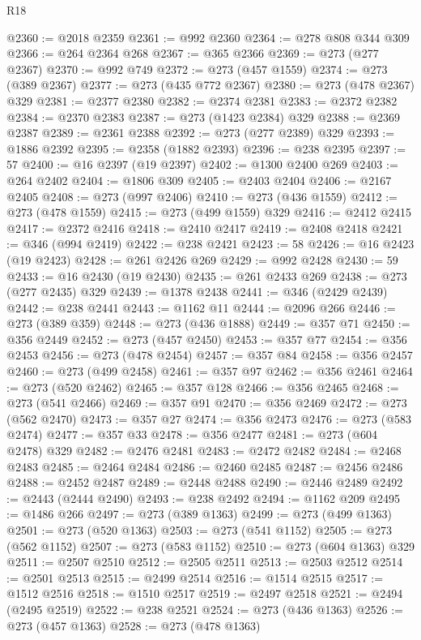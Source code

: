 \begin{lexlean}{R18}
\begin{coremodule}
{{{{{{{{{{{{{{{{{{{@2360 := @2018 @2359
@2361 := @992 @2360
@2364 := @278 @808 @344 @309
@2366 := @264 @2364 @268
@2367 := @365 @2366
@2369 := @273 (@277 @2367)
@2370 := @992 @749
@2372 := @273 (@457 @1559)
@2374 := @273 (@389 @2367)
@2377 := @273 (@435 @772 @2367)
@2380 := @273 (@478 @2367) @329
@2381 := @2377 @2380
@2382 := @2374 @2381
@2383 := @2372 @2382
@2384 := @2370 @2383
@2387 := @273 (@1423 @2384) @329
@2388 := @2369 @2387
@2389 := @2361 @2388
@2392 := @273 (@277 @2389) @329
@2393 := @1886 @2392
@2395 := @2358 (@1882 @2393)
@2396 := @238 @2395
@2397 := 57
@2400 := @16 @2397 (@19 @2397)
@2402 := @1300 @2400 @269
@2403 := @264 @2402
@2404 := @1806 @309
@2405 := @2403 @2404
@2406 := @2167 @2405
@2408 := @273 (@997 @2406)
@2410 := @273 (@436 @1559)
@2412 := @273 (@478 @1559)
@2415 := @273 (@499 @1559) @329
@2416 := @2412 @2415
@2417 := @2372 @2416
@2418 := @2410 @2417
@2419 := @2408 @2418
@2421 := @346 (@994 @2419)
@2422 := @238 @2421
@2423 := 58
@2426 := @16 @2423 (@19 @2423)
@2428 := @261 @2426 @269
@2429 := @992 @2428
@2430 := 59
@2433 := @16 @2430 (@19 @2430)
@2435 := @261 @2433 @269
@2438 := @273 (@277 @2435) @329
@2439 := @1378 @2438
@2441 := @346 (@2429 @2439)
@2442 := @238 @2441
@2443 := @1162 @11
@2444 := @2096 @266
@2446 := @273 (@389 @359)
@2448 := @273 (@436 @1888)
@2449 := @357 @71
@2450 := @356 @2449
@2452 := @273 (@457 @2450)
@2453 := @357 @77
@2454 := @356 @2453
@2456 := @273 (@478 @2454)
@2457 := @357 @84
@2458 := @356 @2457
@2460 := @273 (@499 @2458)
@2461 := @357 @97
@2462 := @356 @2461
@2464 := @273 (@520 @2462)
@2465 := @357 @128
@2466 := @356 @2465
@2468 := @273 (@541 @2466)
@2469 := @357 @91
@2470 := @356 @2469
@2472 := @273 (@562 @2470)
@2473 := @357 @27
@2474 := @356 @2473
@2476 := @273 (@583 @2474)
@2477 := @357 @33
@2478 := @356 @2477
@2481 := @273 (@604 @2478) @329
@2482 := @2476 @2481
@2483 := @2472 @2482
@2484 := @2468 @2483
@2485 := @2464 @2484
@2486 := @2460 @2485
@2487 := @2456 @2486
@2488 := @2452 @2487
@2489 := @2448 @2488
@2490 := @2446 @2489
@2492 := @2443 (@2444 @2490)
@2493 := @238 @2492
@2494 := @1162 @209
@2495 := @1486 @266
@2497 := @273 (@389 @1363)
@2499 := @273 (@499 @1363)
@2501 := @273 (@520 @1363)
@2503 := @273 (@541 @1152)
@2505 := @273 (@562 @1152)
@2507 := @273 (@583 @1152)
@2510 := @273 (@604 @1363) @329
@2511 := @2507 @2510
@2512 := @2505 @2511
@2513 := @2503 @2512
@2514 := @2501 @2513
@2515 := @2499 @2514
@2516 := @1514 @2515
@2517 := @1512 @2516
@2518 := @1510 @2517
@2519 := @2497 @2518
@2521 := @2494 (@2495 @2519)
@2522 := @238 @2521
@2524 := @273 (@436 @1363)
@2526 := @273 (@457 @1363)
@2528 := @273 (@478 @1363)
}}}}}}}}}}}}}}}}}}}
\end{coremodule}
\end{lexlean}
